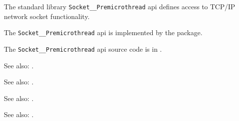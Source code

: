 
The standard library {\tt Socket\_\_Premicrothread} api defines access to {\sc TCP/IP} network socket functionality.

The {\tt Socket\_\_Premicrothread} api is implemented by the  package.

The {\tt Socket\_\_Premicrothread} api source code is in .

See also: .

See also:  .

See also:  .

See also:  .
